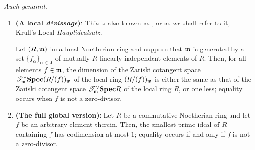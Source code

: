             \begin{lemma} \label{lemma: krull_principal_ideal_theorem} 
                \textit{Auch  genannt}.
                \begin{enumerate}
                    \item \textbf{(A local \textit{d\'evissage}):} This is also known as  \cite[Exercise 12.1.B]{risingsea}, or as we shall refer to it, Krull's Local \textit{Hauptidealsatz}.
                    
                    Let $(R, \mathfrak{m})$ be a local Noetherian ring and suppose that $\mathfrak{m}$ is generated by a set $\{f_{\alpha}\}_{\alpha \in A}$ of mutually $R$-linearly independent elements of $R$. Then, for all elements $f \in \mathfrak{m}$, the dimension of the Zariski cotangent space $\mathscr{T}^{\vee}_{\mathfrak{m}}\mathbf{Spec} (R/(f))_{\mathfrak{m}}$ of the local ring $(R/(f))_{\mathfrak{m}}$ is either the same as that of the Zariski cotangent space $\mathscr{T}^{\vee}_{\mathfrak{m}}\mathbf{Spec} R$ of the local ring $R$, or one less; equality occurs when $f$ is not a zero-divisor.  
                    \item \textbf{(The full global version):} 
                    Let $R$ be a commutative Noetherian ring and let $f$ be an arbitrary element therein. Then, the smallest prime ideal of $R$ containing $f$ has codimension at most $1$; equality occurs if and only if $f$ is not a zero-divisor.
                \end{enumerate}
            \end{lemma}
